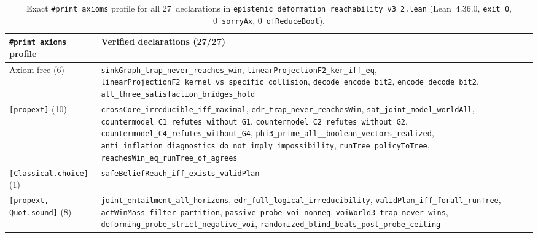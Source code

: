 \documentclass[10pt,a4paper]{article}
\theoremstyle{cleanthm}
\theoremstyle{cleandef}
\begin{document}
\begin{table}[!htbp]
\centering
\caption{Exact \texttt{\#print axioms} profile for all 27~declarations in \texttt{epistemic\_\allowbreak deformation\_\allowbreak reachability\_\allowbreak v3\_\allowbreak 2.lean} (Lean~4.36.0, \texttt{exit 0}, 0~\texttt{sorryAx}, 0~\texttt{ofReduceBool}).}
\label{tab:axioms_v32}
\footnotesize
\begin{tabularx}{\linewidth}{@{}>{\raggedright\arraybackslash}p{45mm} >{\raggedright\arraybackslash}X@{}}
\toprule
\textbf{\texttt{\#print axioms} profile} & \textbf{Verified declarations (27/27)} \\
\midrule
Axiom-free (6) & \texttt{sinkGraph\_\allowbreak trap\_\allowbreak never\_\allowbreak reaches\_\allowbreak win}, \texttt{linearProjectionF2\_\allowbreak ker\_\allowbreak iff\_\allowbreak eq}, \texttt{linearProjectionF2\_\allowbreak kernel\_\allowbreak vs\_\allowbreak specific\_\allowbreak collision}, \texttt{decode\_\allowbreak encode\_\allowbreak bit2}, \texttt{encode\_\allowbreak decode\_\allowbreak bit2}, \texttt{all\_\allowbreak three\_\allowbreak satisfaction\_\allowbreak bridges\_\allowbreak hold} \\
\texttt{[propext]} (10) & \texttt{crossCore\_\allowbreak irreducible\_\allowbreak iff\_\allowbreak maximal}, \texttt{edr\_\allowbreak trap\_\allowbreak never\_\allowbreak reachesWin}, \texttt{sat\_\allowbreak joint\_\allowbreak model\_\allowbreak worldAll}, \texttt{countermodel\_\allowbreak C1\_\allowbreak refutes\_\allowbreak without\_\allowbreak G1}, \texttt{countermodel\_\allowbreak C2\_\allowbreak refutes\_\allowbreak without\_\allowbreak G2}, \texttt{countermodel\_\allowbreak C4\_\allowbreak refutes\_\allowbreak without\_\allowbreak G4}, \texttt{phi3\_\allowbreak prime\_\allowbreak all\_\allowbreak 8\_\allowbreak boolean\_\allowbreak vectors\_\allowbreak realized}, \texttt{anti\_\allowbreak inflation\_\allowbreak diagnostics\_\allowbreak do\_\allowbreak not\_\allowbreak imply\_\allowbreak impossibility}, \texttt{runTree\_\allowbreak policyToTree}, \texttt{reachesWin\_\allowbreak eq\_\allowbreak runTree\_\allowbreak of\_\allowbreak agrees} \\
\texttt{[Classical.choice]} (1) & \texttt{safeBeliefReach\_\allowbreak iff\_\allowbreak exists\_\allowbreak validPlan} \\
\texttt{[propext, Quot.sound]} (8) & \texttt{joint\_\allowbreak entailment\_\allowbreak all\_\allowbreak horizons}, \texttt{edr\_\allowbreak full\_\allowbreak logical\_\allowbreak irreducibility}, \texttt{validPlan\_\allowbreak iff\_\allowbreak forall\_\allowbreak runTree}, \texttt{actWinMass\_\allowbreak filter\_\allowbreak partition}, \texttt{passive\_\allowbreak probe\_\allowbreak voi\_\allowbreak nonneg}, \texttt{voiWorld3\_\allowbreak trap\_\allowbreak never\_\allowbreak wins}, \texttt{deforming\_\allowbreak probe\_\allowbreak strict\_\allowbreak negative\_\allowbreak voi}, \texttt{randomized\_\allowbreak blind\_\allowbreak beats\_\allowbreak post\_\allowbreak probe\_\allowbreak ceiling} \\

\end{tabularx}
\end{table}
\end{document}
